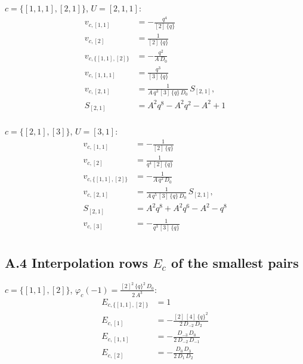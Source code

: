 \documentclass[11pt]{article}
\begin{document}
\noindent $c = \{[1,1,1],[2,1]\}$, $U = [2,1,1]$:
\begin{align*}
v_{c,[1,1]} &= -\frac{q^{4}}{[2]\,\{q\}} \\
v_{c,[2]} &= \frac{1}{[2]\,\{q\}} \\
v_{c,\{[1,1],[2]\}} &= -\frac{q^{2}}{A\,D_{0}} \\
v_{c,[1,1,1]} &= \frac{q^{3}}{[3]\,\{q\}} \\
v_{c,[2,1]} &= \frac{1}{A\,q^{3}\,[3]\,\{q\}\,D_{0}}\,S_{[2,1]}, \\
 S_{[2,1]} &= A^{2}q^{8}-A^{2}q^{2}-A^{2}+1 \\
\end{align*}

\noindent $c = \{[2,1],[3]\}$, $U = [3,1]$:
\begin{align*}
v_{c,[1,1]} &= -\frac{1}{[2]\,\{q\}} \\
v_{c,[2]} &= \frac{1}{q^{4}\,[2]\,\{q\}} \\
v_{c,\{[1,1],[2]\}} &= -\frac{1}{A\,q^{2}\,D_{0}} \\
v_{c,[2,1]} &= \frac{1}{A\,q^{5}\,[3]\,\{q\}\,D_{0}}\,S_{[2,1]}, \\
 S_{[2,1]} &= A^{2}q^{8}+A^{2}q^{6}-A^{2}-q^{8} \\
v_{c,[3]} &= -\frac{1}{q^{3}\,[3]\,\{q\}} \\
\end{align*}

\subsection*{A.4 Interpolation rows $E_c$ of the smallest pairs}
\noindent $c = \{[1,1],[2]\}$, $\varphi_c(-1) = \frac{[2]^{2}\,\{q\}^{2}\,D_{0}}{2\,A^{3}}$:
\begin{align*}
E_{c,\{[1,1],[2]\}} &= 1 \\
E_{c,[1]} &= -\frac{[2]\,[4]\,\{q\}^{2}}{2\,D_{-2}\,D_{2}} \\
E_{c,[1,1]} &= -\frac{D_{-3}\,D_{0}}{2\,D_{-2}\,D_{-1}} \\
E_{c,[2]} &= -\frac{D_{0}\,D_{3}}{2\,D_{1}\,D_{2}} \\
\end{align*}
\end{document}
